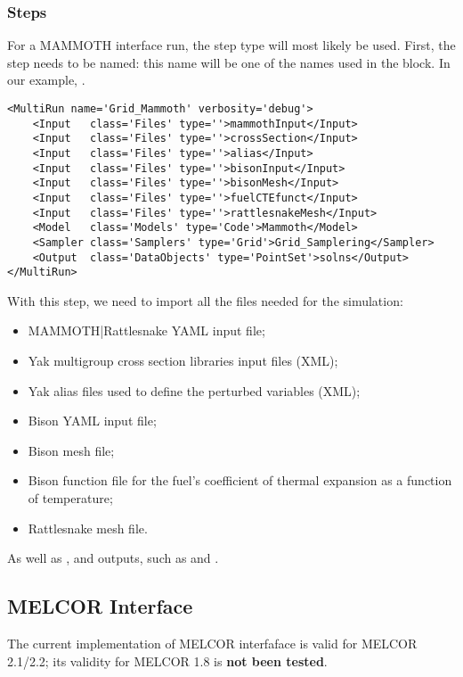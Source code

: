 \subsubsection{Steps}
For a MAMMOTH interface run, the  step type will most likely be used. First, the step needs
to be named: this name will be one of the names used in the  block. In our example, .
%
\begin{lstlisting}[style=XML]
<MultiRun name='Grid_Mammoth' verbosity='debug'>
    <Input   class='Files' type=''>mammothInput</Input>
    <Input   class='Files' type=''>crossSection</Input>
    <Input   class='Files' type=''>alias</Input>
    <Input   class='Files' type=''>bisonInput</Input>
    <Input   class='Files' type=''>bisonMesh</Input>
    <Input   class='Files' type=''>fuelCTEfunct</Input>
    <Input   class='Files' type=''>rattlesnakeMesh</Input>
    <Model   class='Models' type='Code'>Mammoth</Model>
    <Sampler class='Samplers' type='Grid'>Grid_Samplering</Sampler>
    <Output  class='DataObjects' type='PointSet'>solns</Output>
</MultiRun>
\end{lstlisting}
%
With this step, we need to import all the files needed for the simulation:
%
\begin{itemize}
  \item MAMMOTH|Rattlesnake YAML input file;
  \item Yak multigroup cross section libraries input files (XML);
  \item Yak alias files used to define the perturbed variables (XML);
  \item Bison YAML input file;
  \item Bison mesh file;
  \item Bison function file for the fuel's coefficient of thermal expansion as a function of temperature;
  \item Rattlesnake mesh file.
\end{itemize}
As well as ,  and outputs, such as  and .

\subsection{MELCOR Interface}
\label{subsec:MELCORInterface}

The current implementation of MELCOR interfaface is valid for MELCOR 2.1/2.2; its validity for MELCOR
1.8 is \textbf{not been tested}.

